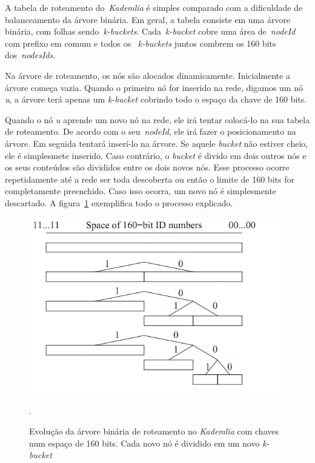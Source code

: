A tabela de roteamento do~\emph{Kademlia} é simples comparado com a dificuldade de balanceamento da árvore binária. Em geral, a tabela consiste em uma árvore binária, com folhas sendo~\emph{k-buckets}. Cada~\emph{k-bucket} cobre uma área de~\emph{nodeId} com prefixo em comum e todos os ~\emph{k-buckets} juntos combrem os 160 bits dos~\emph{nodesIds}.

Na árvore de roteamento, os nós são alocados dinamicamente. Inicialmente a árvore começa vazia. Quando o primeiro nó for inserido na rede, digamos um nó \emph{u}, a árvore terá apenas um \emph{k-bucket} cobrindo todo o espaço da chave de 160 bits.

Quando o nó \emph{u} aprende um novo nó na rede, ele irá tentar colocá-lo na sua tabela de roteamento. De acordo com o seu~\emph{nodeId}, ele irá fazer o posicionamento na árvore. Em seguida tentará inserí-lo na árvore. Se aquele \emph{bucket} não estiver cheio, ele é simplesmete inserido. Caso contrário, o \emph{bucket} é divido em dois outros nós e os seus conteúdos são divididos entre os dois novos nós. Esse processo ocorre repetidamente até a rede ser toda descoberta ou então o limite de 160 bits for completamente preenchido. Caso isso ocorra, um novo nó é simplesmente descartado. A figura~\ref{fig:kademlia-k-bucket} exemplifica todo o processo explicado.

\begin{figure}
	\centering
	\includegraphics[scale=0.5]{images/kademlia-k-bucket.png}
	\caption{Evolução da árvore binária de roteamento no \emph{Kademlia} com chaves num espaço de 160 bits. Cada novo nó é dividido em um novo \emph{k-bucket}}.
	\label{fig:kademlia-k-bucket}
\end{figure}

